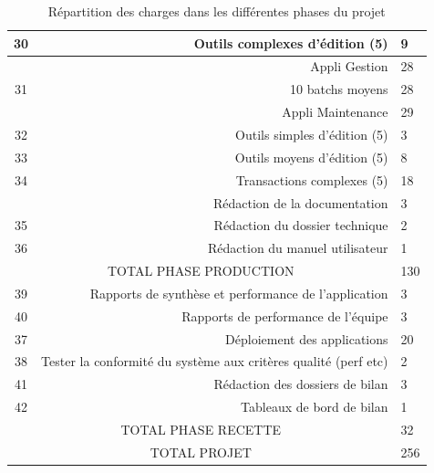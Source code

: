 \documentclass[a4paper]{article}
\begin{document}
\begin{table}[!htp]
\begin{tabular}{|cr|l|}
\cellcolor[HTML]{b6d7a8} 30&Outils complexes d’édition (5) &9 \\\hline
\cellcolor[HTML]{6aa84f} &\cellcolor[HTML]{93c47d}Appli Gestion &\cellcolor[HTML]{93c47d}28 \\\hline
\cellcolor[HTML]{b6d7a8} 31&10 batchs moyens &28 \\\hline
\cellcolor[HTML]{6aa84f} &\cellcolor[HTML]{93c47d}Appli Maintenance &\cellcolor[HTML]{93c47d}29 \\\hline
\cellcolor[HTML]{b6d7a8} 32&Outils simples d’édition (5) &3 \\\hline
\cellcolor[HTML]{b6d7a8} 33&Outils moyens d’édition (5) &8 \\\hline
\cellcolor[HTML]{b6d7a8} 34&Transactions complexes (5) &18 \\\hline
\cellcolor[HTML]{6aa84f} &\cellcolor[HTML]{93c47d}Rédaction de la documentation &\cellcolor[HTML]{93c47d}3 \\\hline
\cellcolor[HTML]{b6d7a8} 35&Rédaction du dossier technique &2 \\\hline
\cellcolor[HTML]{b6d7a8} 36&Rédaction du manuel utilisateur &1 \\\hline
\multicolumn{2}{|c}{\cellcolor[HTML]{d5a6bd}TOTAL PHASE PRODUCTION} &\cellcolor[HTML]{d5a6bd}130 \\\hline
\cellcolor[HTML]{a4c2f4} 39&Rapports de synthèse et performance de l’application &3 \\\hline
\cellcolor[HTML]{a4c2f4} 40&Rapports de performance de l’équipe &3 \\\hline
\cellcolor[HTML]{a4c2f4} 37&Déploiement des applications &20 \\\hline
\cellcolor[HTML]{a4c2f4} 38&Tester la conformité du système aux critères qualité (perf etc) &2 \\\hline
\cellcolor[HTML]{a4c2f4} 41&Rédaction des dossiers de bilan &3 \\\hline
\cellcolor[HTML]{a4c2f4}42 &Tableaux de bord de bilan &1 \\\hline
\multicolumn{2}{|c}{\cellcolor[HTML]{d5a6bd}TOTAL PHASE RECETTE} &\cellcolor[HTML]{d5a6bd}32 \\\hline
\multicolumn{2}{|c}{\cellcolor[HTML]{c27ba0}TOTAL PROJET} &\cellcolor[HTML]{c27ba0}256 \\
\bottomrule
\end{tabular}
\caption{Répartition des charges dans les différentes phases du projet}
\end{table}
	
\end{document}
